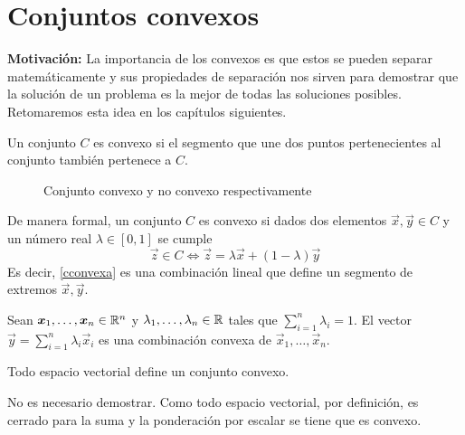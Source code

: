 
\section{Conjuntos convexos}


\textbf{Motivaci\'on:} La importancia de los convexos es que estos se pueden separar matem\'aticamente y sus propiedades de separaci\'on nos sirven para demostrar que la soluci\'on de un problema es la mejor de todas las soluciones posibles. Retomaremos esta idea en los cap\'itulos siguientes.

\begin{definicion}\label{conjuntoconvexo}
Un conjunto $C$ es convexo si el segmento que une dos puntos pertenecientes al conjunto tambi\'en pertenece a $C$.
\begin{figure}[H]
	\centering
	
	\caption{Conjunto convexo y no convexo respectivamente}
\end{figure}
De manera formal, un conjunto $C$ es convexo si dados dos elementos $\vec{x},\vec{y} \in C$ y un n\'umero real $\lambda \in [0,1]$ se cumple
\begin{equation} \label{cconvexa}
\vec{z} \in C \Leftrightarrow \vec{z}=\lambda \vec{x} + (1 - \lambda) \vec{y} 
\end{equation}
Es decir, \eqref{cconvexa} es una combinaci\'on lineal  que define un segmento de extremos $\vec{x},\vec{y}$. 
\end{definicion}

\begin{definicion}
Sean $\boldsymbol{x}_1 , \ldots , \boldsymbol{x}_n \in \mathbb{R}^n$ y $\lambda_1 , \ldots , \lambda_n \in \mathbb{R}$ tales que $\sum_{i=1}^{n} \lambda_i =1$. El vector $\vec{y} = \sum_{i=1}^{n} \lambda_i \vec{x}_i$ es una combinaci\'on convexa de $\vec{x}_1 , \ldots , \vec{x}_n$.
\end{definicion}

\begin{proposicion} 
Todo espacio vectorial define un conjunto convexo.
\end{proposicion}

\begin{demostracion}
No es necesario demostrar. Como todo espacio vectorial, por definici\'on, es cerrado para la suma y la ponderaci\'on por escalar se tiene que es convexo.
\end{demostracion}

